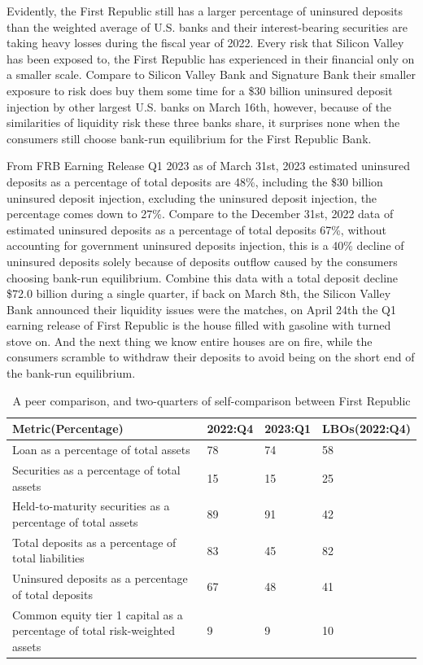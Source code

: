 \documentclass[a4paper]{article}
\begin{document}
Evidently, the First Republic still has a larger percentage of uninsured deposits than the weighted average of U.S. banks and their interest-bearing securities are taking heavy losses during the fiscal year of 2022. Every risk that Silicon Valley has been exposed to, the First Republic has experienced in their financial only on a smaller scale. Compare to Silicon Valley Bank and Signature Bank their smaller exposure to risk does buy them some time for a \$30 billion uninsured deposit injection by other largest U.S. banks on March 16th, however, because of the similarities of liquidity risk these three banks share, it surprises none when the consumers still choose bank-run equilibrium for the First Republic Bank.

From FRB Earning Release Q1 2023 as of March 31st, 2023 estimated uninsured deposits as a percentage of total deposits are 48\%, including the \$30 billion uninsured deposit injection, excluding the uninsured deposit injection, the percentage comes down to 27\%. Compare to the December 31st, 2022 data of estimated uninsured deposits as a percentage of total deposits 67\%, without accounting for government uninsured deposits injection, this is a 40\% decline of uninsured deposits solely because of deposits outflow caused by the consumers choosing bank-run equilibrium. Combine this data with a total deposit decline \$72.0 billion during a single quarter, if back on March 8th, the Silicon Valley Bank announced their liquidity issues were the matches, on April 24th the Q1 earning release of First Republic is the house filled with gasoline with turned stove on. And the next thing we know entire houses are on fire, while the consumers scramble to withdraw their deposits to avoid being on the short end of the bank-run equilibrium. 

\begin{table}[]
    \centering
    \begin{tabular}{|p{7.5cm}||p{1cm}||p{1cm}||p{2.5cm}|}
        \hline
        \textrm{Metric(Percentage)}& \textrm{2022:Q4}& \textrm{2023:Q1}& \textrm{LBOs(2022:Q4)}\\
        \hline
        Loan as a percentage of total assets & 78 & 74 & 58\\
        \hline
        Securities as a percentage of total assets & 15 & 15 & 25 \\
        \hline
        Held-to-maturity securities as a percentage of total assets & 89 & 91 & 42\\
        \hline
        Total deposits as a percentage of total liabilities & 83 & 45 & 82\\
        \hline
        Uninsured deposits as a percentage of total deposits & 67 & 48 & 41\\
        \hline
        Common equity tier 1 capital as a percentage of total risk-weighted assets & 9 & 9 & 10\\
        \hline   
    \end{tabular}
    \caption{A peer comparison, and two-quarters of self-comparison between First Republic}
    
    \label{tab:my_label}
\end{table}
\end{document}
